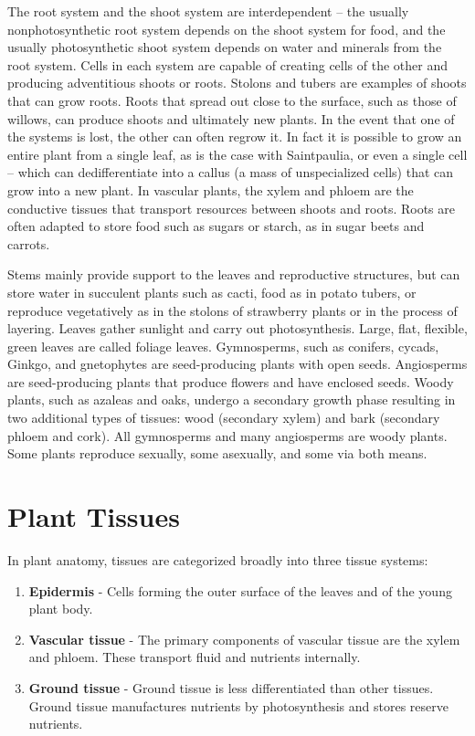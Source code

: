 \documentclass[]{book}
\providecommand{\tightlist}{%
  \setlength{\itemsep}{0pt}\setlength{\parskip}{0pt}}
\theoremstyle{definition}
\theoremstyle{definition}
\theoremstyle{definition}
\theoremstyle{remark}
\begin{document}
\begin{enumerate}
The root system and the shoot system are interdependent -- the usually
nonphotosynthetic root system depends on the shoot system for food, and
the usually photosynthetic shoot system depends on water and minerals
from the root system. Cells in each system are capable of creating cells
of the other and producing adventitious shoots or roots. Stolons and
tubers are examples of shoots that can grow roots. Roots that spread out
close to the surface, such as those of willows, can produce shoots and
ultimately new plants. In the event that one of the systems is lost, the
other can often regrow it. In fact it is possible to grow an entire
plant from a single leaf, as is the case with Saintpaulia, or even a
single cell -- which can dedifferentiate into a callus (a mass of
unspecialized cells) that can grow into a new plant. In vascular plants,
the xylem and phloem are the conductive tissues that transport resources
between shoots and roots. Roots are often adapted to store food such as
sugars or starch, as in sugar beets and carrots.

Stems mainly provide support to the leaves and reproductive structures,
but can store water in succulent plants such as cacti, food as in potato
tubers, or reproduce vegetatively as in the stolons of strawberry plants
or in the process of layering. Leaves gather sunlight and carry out
photosynthesis. Large, flat, flexible, green leaves are called foliage
leaves. Gymnosperms, such as conifers, cycads, Ginkgo, and gnetophytes
are seed-producing plants with open seeds. Angiosperms are
seed-producing plants that produce flowers and have enclosed seeds.
Woody plants, such as azaleas and oaks, undergo a secondary growth phase
resulting in two additional types of tissues: wood (secondary xylem) and
bark (secondary phloem and cork). All gymnosperms and many angiosperms
are woody plants. Some plants reproduce sexually, some asexually, and
some via both means.

\section{Plant Tissues}\label{plant-tissues}

In plant anatomy, tissues are categorized broadly into three tissue
systems:

\begin{enumerate}
\def\labelenumi{\arabic{enumi}.}
\tightlist
\item
  \textbf{Epidermis} - Cells forming the outer surface of the leaves and
  of the young plant body.
\item
  \textbf{Vascular tissue} - The primary components of vascular tissue
  are the xylem and phloem. These transport fluid and nutrients
  internally.
\item
  \textbf{Ground tissue} - Ground tissue is less differentiated than
  other tissues. Ground tissue manufactures nutrients by photosynthesis
  and stores reserve nutrients.
\end{enumerate}


\end{enumerate}
\end{document}
